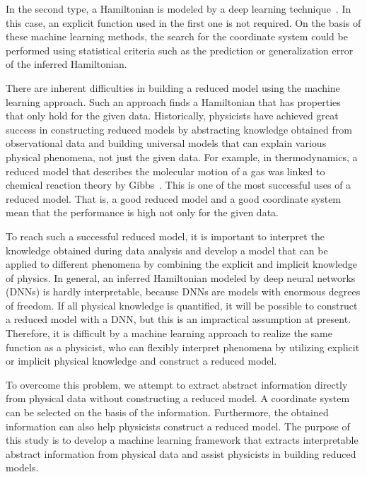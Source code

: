 \documentclass[preprint,
bibnotes,
 amsmath,amssymb,
 aps,
]{revtex4-1}
\begin{document}
In the second type, a Hamiltonian is modeled by a deep learning technique~\cite{NIPS2019_9672, toth2019hamiltonian, bondesan2019learning}. In this case, an explicit function used in the first one is not required. 
On the basis of these machine learning methods, the search for the coordinate system could be performed using statistical criteria such as the prediction or generalization error of the inferred Hamiltonian.\par
There are inherent difficulties in building a reduced model using the machine learning approach. 
Such an approach finds a Hamiltonian that has properties that only hold for the given data. 
Historically, physicists have achieved great success in constructing reduced models by abstracting knowledge obtained from observational data and building universal models that can explain various physical phenomena, not just the given data. 
For example, in thermodynamics, a reduced model that describes the molecular motion of a gas was linked to chemical reaction theory by Gibbs~\cite{gibbs1876, gibbs1878}. This is one of the most successful uses of a reduced model. 
That is, a good reduced model and a good coordinate system mean that the performance is high not only for the given data.\par
To reach such a successful reduced model, it is important to interpret the knowledge obtained during data analysis and develop a model that can be applied to different phenomena by combining the explicit and implicit knowledge of physics. 
In general, an inferred Hamiltonian modeled by deep neural networks (DNNs) is hardly interpretable, because DNNs are models with enormous degrees of freedom. 
If all physical knowledge is quantified, it will be possible to construct a reduced model with a DNN, but this is an impractical assumption at present. 
Therefore, it is difficult by a machine learning approach to realize the same function as a physicist, who can flexibly interpret phenomena by utilizing explicit or implicit physical knowledge and construct a reduced model. \par
To overcome this problem, we attempt to extract abstract information directly from physical data without constructing a reduced model. 
A coordinate system can be selected on the basis of the information. 
Furthermore, the obtained information can also help physicists construct a reduced model. 
The purpose of this study is to develop a machine learning framework that extracts interpretable abstract information from physical data and assist physicists in building reduced models.\par
\end{document}
